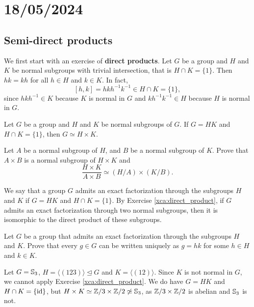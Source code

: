 \section{18/05/2024}

\subsection{Semi-direct products}

We first start with an exercise of \textbf{direct products}. Let $G$ be a group and $H$ and $K$ be normal subgroups with trivial intersection, that is $H\cap K=\{1\}$. 
Then $hk=kh$ for all $h\in H$ and $k\in K$. In fact, 
\[
[h,k]=hkh^{-1}k^{-1}\in H\cap K=\{1\}, 
\]
since $hkh^{-1}\in K$ because $K$ is normal in $G$ and 
$kh^{-1}k^{-1}\in H$ because $H$ is normal in $G$. 

\begin{exercise}
\label{xca:direct_product}
Let $G$ be a group and $H$ and $K$ be normal subgroups of $G$.
If $G=HK$ and $H\cap K=\{1\}$, then $G\simeq H\times K$.
\end{exercise}

\begin{exercise}
\label{xca:direct_product:quotient}
Let $A$ be a normal subgroup of $H$, and $B$ be a normal subgroup of $K$. 
Prove that $A\times B$ is a normal subgroup of
$H\times K$ and 
\[
\frac{H\times K}{A\times B}\simeq(H/A)\times(K/B).
\]
\end{exercise}

We say that a group $G$ admits an exact factorization through 
the subgroups $H$ and $K$ if $G=HK$ and 
$H\cap K=\{1\}$. By Exercise \ref{xca:direct_product}, 
if $G$ admits an exact factorization through two normal subgroups, then 
it is isomorphic to the direct product of these subgroups. 

\begin{exercise}
\label{xca:uniqueness}
    Let $G$ be a group that admits an exact factorization through
    the subgroups $H$ and $K$. Prove that every $g\in G$ can be written 
    uniquely as $g=hk$ for some $h\in H$ and $k\in K$. 
\end{exercise}

\begin{example}
Let $G=\mathbb{S}_3$, $H=\langle (123)\rangle\unlhd G$ and $K=\langle (12)\rangle$. Since
$K$ is not normal in $G$, we cannot apply Exercise \ref{xca:direct_product}. 
We do have $G=HK$ and $H\cap K=\{\operatorname{id}\}$, but $H\times K\simeq\mathbb{Z}/3\times\mathbb{Z}/2\not\simeq\mathbb{S}_3$, 
as $\mathbb{Z}/3\times\mathbb{Z}/2$ is abelian and $\mathbb{S}_3$ is not. 
\end{example}


